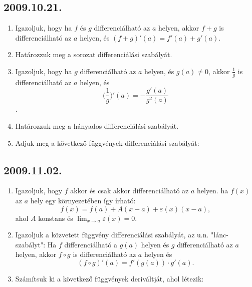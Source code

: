 \subsection*{2009.10.21.}
\begin{enumerate}
\item Igazoljuk, hogy ha $f$ és $g$ differenciálható az \underline{$a$} helyen, akkor $f+g		$ is differenciálható az \underline{$a$} helyen, és $(f+g)'(a)=f'(a)+g'(a)$.
\item Határozzuk meg a sorozat differenciálási szabályát.
\item Igazoljuk, hogy ha $g$ differenciálható az \underline{$a$} helyen, és $g(a)\neq 0$, 		akkor $\frac{1}{g}$ is differenciálható az \underline{$a$} helyen, és 
	\[ \bigg(\frac{1}{g}\bigg)'(a)=-\frac{g'(a)}{g^2(a)} \].
\item Határozzuk meg a hányados differenciálási szabályát.
\item Adjuk meg a következő függvények differenciálási szabályát:
\end{enumerate}

\subsection*{2009.11.02.}
\begin{enumerate}
\item Igazoljuk, hogy $f$ akkor és csak akkor differenciálható az \underline{$a$} helyen. 		ha $f(x)$ az \underline{$a$} hely egy környezetében így írható:
	\[f(x)=f(a)+A(x-a)+\varepsilon (x)(x-a), \]
	ahol $A$ konstans és $\lim_{x \to a} \varepsilon (x)=0$.
\item Igazoljuk a közvetett függvény differenciálási szabályát, az u.n. "lánc-szabályt": 		Ha $f$ differenciálható a $g(a)$ helyen és $g$ differenciálható az $a$ helyen, akkor 		$f\circ g$ is differenciálható az $a$ helyen és \[(f \circ g)'(a)=f'(g(a))\cdot g'(a).		\] 
\item Számítsuk ki a következő függvények deriváltját, ahol létezik:
\end{enumerate}

